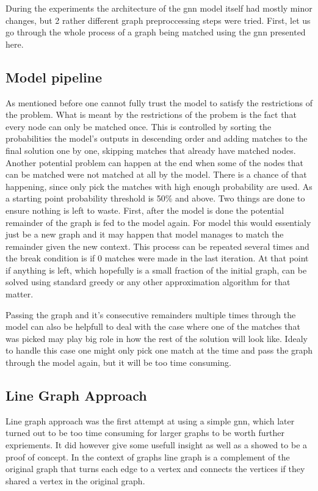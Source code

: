 During the experiments the architecture of the \gls{gnn} model itself had mostly minor changes, but 2 rather different graph preproccessing steps were tried. First, let us go through the whole process of a graph being matched using the \gls{gnn} presented here.

\subsection{Model pipeline}

As mentioned before one cannot fully trust the model to satisfy the restrictions of the problem. What is meant by the restrictions of the probem is the fact that every node can only be matched once. This is controlled by sorting the probabilities the model's outputs in descending order and adding matches to the final solution one by one, skipping matches that already have matched nodes. Another potential problem can happen at the end when some of the nodes that can be matched were not matched at all by the model. There is a chance of that happening, since only pick the matches with high enough probability are used. As a starting point probability threshold is 50\% and above. Two things are done to ensure nothing is left to waste. First, after the model is done the potential remainder of the graph is fed to the model again. For model this would essentialy just be a new graph and it may happen that model manages to match the remainder given the new context. This process can be repeated several times and the break condition is if 0 matches were made in the last iteration. At that point if anything is left, which hopefully is a small fraction of the initial graph, can be solved using standard greedy or any other approximation algorithm for that matter.

Passing the graph and it's consecutive remainders multiple times through the model can also be helpfull to deal with the case where one of the matches that was picked may play big role in how the rest of the solution will look like. Idealy to handle this case one might only pick one match at the time and pass the graph through the model again, but it will be too time consuming.

\subsection{Line Graph Approach}

Line graph approach was the first attempt at using a simple \gls{gnn}, which later turned out to be too time consuming for larger graphs to be worth further expriements. It did however give some usefull insight as well as a showed to be a proof of concept. In the context of graphs line graph is a complement of the original graph that turns each edge to a vertex and connects the vertices if they shared a vertex in the original graph. 

